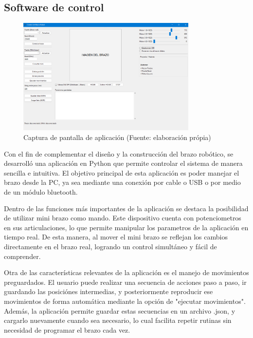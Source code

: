 \subsection{Software de control}

\begin{figure}[H]
  \centering
  \includegraphics[width=0.8\textwidth]{anexos/software/ventanaApp.png}
  \caption{Captura de pantalla de aplicación (Fuente: elaboración própia)}\label{fig:captura.ventanaApp}
\end{figure}

Con el fin de complementar el diseño y la construcción del brazo robótico, se desarrolló una aplicación en Python que permite controlar el sistema de manera sencilla e intuitiva. El objetivo principal de esta aplicación es poder manejar el brazo desde la PC, ya sea mediante una conexión por cable o USB o por medio de un módulo bluetooth.

Dentro de las funciones más importantes de la aplicación se destaca la posibilidad de utilizar mini brazo como mando. Este dispositivo cuenta con potenciometros en sus articulaciones, lo que permite manipular los parametros de la aplicación en tiempo real. De esta manera, al mover el mini brazo se reflejan los cambios directamente en el brazo real, logrando un control simultáneo y fácil de comprender.

Otra de las características relevantes de la aplicación es el manejo de movimientos preguardados. El usuario puede realizar una secuencia de acciones paso a paso, ir guardando las posiciónes intermedias, y posteriormente reproducir ese movimientos de forma automática mediante la opción de "ejecutar movimientos". Además, la aplicación permite guardar estas secuencias en un archivo .json, y cargarlo nuevamente cuando sea necesario, lo cual facilita repetir rutinas sin necesidad de programar el brazo cada vez.

